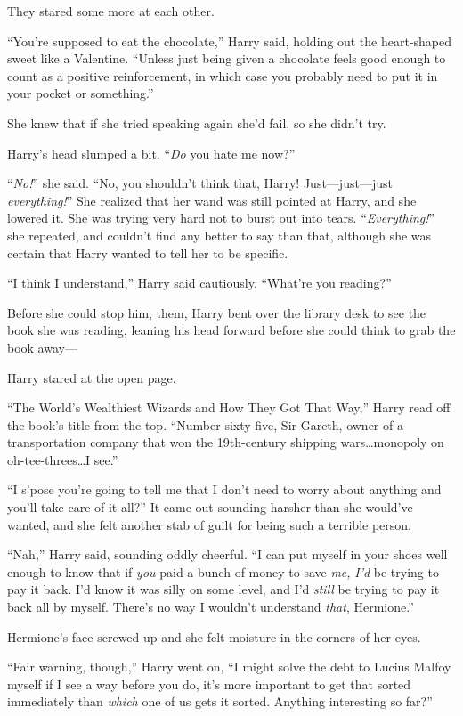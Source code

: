 They stared some more at each other.

“You’re supposed to eat the chocolate,” Harry said, holding out the heart-shaped sweet like a Valentine. “Unless just being given a chocolate feels good enough to count as a positive reinforcement, in which case you probably need to put it in your pocket or something.”

She knew that if she tried speaking again she’d fail, so she didn’t try.

Harry’s head slumped a bit. “\emph{Do} you hate me now?”

“\emph{No!}” she said. “No, you shouldn’t think that, Harry! Just—just—just \emph{everything!}” She realized that her wand was still pointed at Harry, and she lowered it. She was trying very hard not to burst out into tears. “\emph{Everything!}” she repeated, and couldn’t find any better to say than that, although she was certain that Harry wanted to tell her to be specific.

“I think I understand,” Harry said cautiously. “What’re you reading?”

Before she could stop him, them, Harry bent over the library desk to see the book she was reading, leaning his head forward before she could think to grab the book away—

Harry stared at the open page.

“The World’s Wealthiest Wizards and How They Got That Way,” Harry read off the book’s title from the top. “Number sixty-five, Sir Gareth, owner of a transportation company that won the 19th-century shipping wars…monopoly on oh-tee-threes…I see.”

“I s’pose you’re going to tell me that I don’t need to worry about anything and you’ll take care of it all?” It came out sounding harsher than she would’ve wanted, and she felt another stab of guilt for being such a terrible person.

“Nah,” Harry said, sounding oddly cheerful. “I can put myself in your shoes well enough to know that if \emph{you} paid a bunch of money to save \emph{me,} \emph{I’d} be trying to pay it back. I’d know it was silly on some level, and I’d \emph{still} be trying to pay it back all by myself. There’s no way I wouldn’t understand \emph{that}, Hermione.”

Hermione’s face screwed up and she felt moisture in the corners of her eyes.

“Fair warning, though,” Harry went on, “I might solve the debt to Lucius Malfoy myself if I see a way before you do, it’s more important to get that sorted immediately than \emph{which} one of us gets it sorted. Anything interesting so far?”


